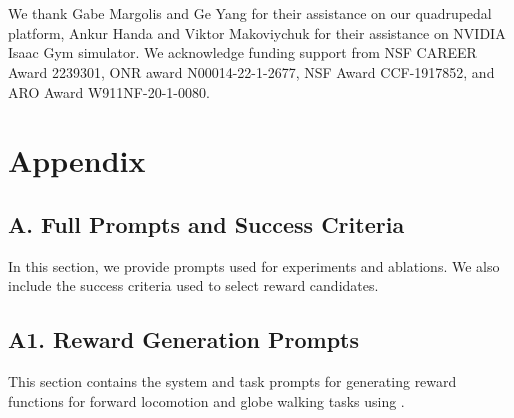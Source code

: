 \documentclass[conference]{IEEEtran}
\begin{document}
\section*{}
We thank Gabe Margolis and Ge Yang for their assistance on our quadrupedal platform, Ankur Handa and Viktor Makoviychuk for their assistance on NVIDIA Isaac Gym simulator. We acknowledge funding support from NSF CAREER Award 2239301, ONR award N00014-22-1-2677, NSF Award CCF-1917852, and ARO Award W911NF-20-1-0080.
\clearpage





\clearpage 

\onecolumn
\renewcommand\lstlistingname{Prompt}
\setcounter{lstlisting}{0}
\section*{Appendix}
\subsection*{A. Full Prompts and Success Criteria}
\label{appendix:full-prompts}
In this section, we provide \ourmethod prompts used for experiments and ablations. We also include the success criteria used to select reward candidates.
\subsection*{A1. Reward Generation Prompts}
This section contains the system and task prompts for generating reward functions for forward locomotion and globe walking tasks using \ourmethod.





\end{document}
